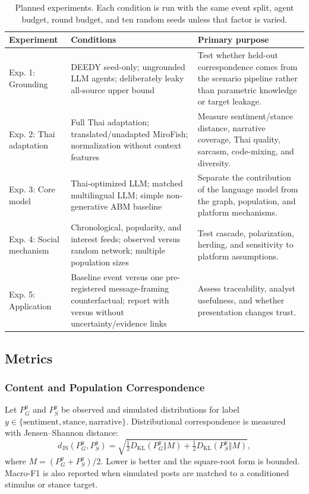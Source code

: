 \documentclass[conference]{IEEEtran}
\begin{document}
\begin{table}[t]
\caption{Planned experiments. Each condition is run with the same event split,
agent budget, round budget, and ten random seeds unless that factor is varied.}
\label{tab:experiments}
\centering
\footnotesize
\begin{tabular}{@{}p{}p{}p{}@{}}
\toprule
Experiment & Conditions & Primary purpose \\
\midrule
Exp. 1: Grounding & DEEDY seed-only; ungrounded LLM agents; deliberately leaky
all-source upper bound & Test whether held-out correspondence comes from the
scenario pipeline rather than parametric knowledge or target leakage. \\
Exp. 2: Thai adaptation & Full Thai adaptation; translated/unadapted MiroFish;
normalization without context features & Measure sentiment/stance distance,
narrative coverage, Thai quality, sarcasm, code-mixing, and diversity. \\
Exp. 3: Core model & Thai-optimized LLM; matched multilingual LLM; simple
non-generative ABM baseline & Separate the contribution of the language model
from the graph, population, and platform mechanisms. \\
Exp. 4: Social mechanism & Chronological, popularity, and interest feeds;
observed versus random network; multiple population sizes & Test cascade,
polarization, herding, and sensitivity to platform assumptions. \\
Exp. 5: Application & Baseline event versus one pre-registered message-framing
counterfactual; report with versus without uncertainty/evidence links & Assess
traceability, analyst usefulness, and whether presentation changes trust. \\
\bottomrule
\end{tabular}
\end{table}

\subsection{Metrics}

\subsubsection{Content and Population Correspondence}

Let $P_G^y$ and $P_S^y$ be observed and simulated distributions for label
$y\in\{\text{sentiment},\text{stance},\text{narrative}\}$. Distributional
correspondence is measured with Jensen--Shannon distance:
\begin{equation}
 d_{\mathrm{JS}}(P_G^y,P_S^y)=
 \sqrt{\tfrac{1}{2}D_{\mathrm{KL}}(P_G^y\Vert M)+
 \tfrac{1}{2}D_{\mathrm{KL}}(P_S^y\Vert M)},
\end{equation}
where $M=(P_G^y+P_S^y)/2$. Lower is better and the square-root form is bounded.
Macro-F1 is also reported when simulated posts are matched to a conditioned
stimulus or stance target.
\end{document}
